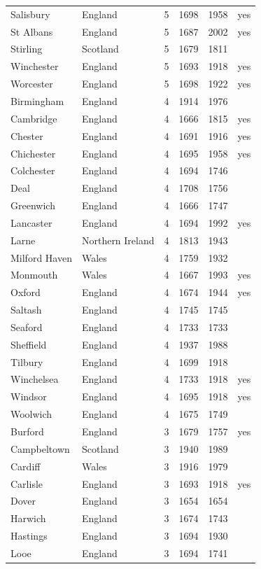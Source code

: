 \documentclass[11pt,a4paper]{article}
\begin{document}
{\begin{longtable}{llrrrl}
Salisbury & England & 5 & 1698 & 1958 & yes\\
St Albans & England & 5 & 1687 & 2002 & yes\\
Stirling & Scotland & 5 & 1679 & 1811 & \\
Winchester & England & 5 & 1693 & 1918 & yes\\
Worcester & England & 5 & 1698 & 1922 & yes\\
Birmingham & England & 4 & 1914 & 1976 & \\
Cambridge & England & 4 & 1666 & 1815 & yes\\
Chester & England & 4 & 1691 & 1916 & yes\\
Chichester & England & 4 & 1695 & 1958 & yes\\
Colchester & England & 4 & 1694 & 1746 & \\
Deal & England & 4 & 1708 & 1756 & \\
Greenwich & England & 4 & 1666 & 1747 & \\
Lancaster & England & 4 & 1694 & 1992 & yes\\
Larne & Northern Ireland & 4 & 1813 & 1943 & \\
Milford Haven & Wales & 4 & 1759 & 1932 & \\
Monmouth & Wales & 4 & 1667 & 1993 & yes\\
Oxford & England & 4 & 1674 & 1944 & yes\\
Saltash & England & 4 & 1745 & 1745 & \\
Seaford & England & 4 & 1733 & 1733 & \\
Sheffield & England & 4 & 1937 & 1988 & \\
Tilbury & England & 4 & 1699 & 1918 & \\
Winchelsea & England & 4 & 1733 & 1918 & yes\\
Windsor & England & 4 & 1695 & 1918 & yes\\
Woolwich & England & 4 & 1675 & 1749 & \\
Burford & England & 3 & 1679 & 1757 & yes\\
Campbeltown & Scotland & 3 & 1940 & 1989 & \\
Cardiff & Wales & 3 & 1916 & 1979 & \\
Carlisle & England & 3 & 1693 & 1918 & yes\\
Dover & England & 3 & 1654 & 1654 & \\
Harwich & England & 3 & 1674 & 1743 & \\
Hastings & England & 3 & 1694 & 1930 & \\
Looe & England & 3 & 1694 & 1741 & \\

\end{longtable}}
\end{document}
